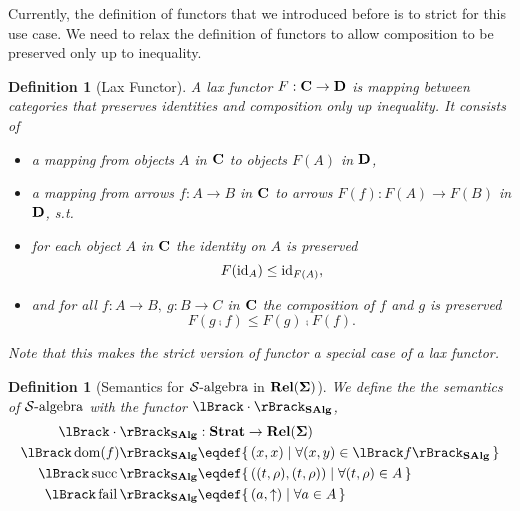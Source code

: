 \documentclass{article}
\newtheorem{definition}[theorem]{Definition}
\begin{document}
Currently, the definition of functors that we introduced before is to strict for this use case. We need to relax the definition of functors to allow composition to be preserved only up to inequality.

\begin{definition}[Lax Functor] \normalfont
  A \emph{lax} functor $F: \mathbf{C} \rightarrow \mathbf{D}$ is mapping between categories that preserves identities and composition only up inequality. It consists of
  \begin{itemize}
    \item a mapping from objects $A$ in $\mathbf{C}$ to objects $F(A)$ in $\mathbf{D}$,
    \item a mapping from arrows $f:A \rightarrow B$ in $\mathbf{C}$ to arrows $F(f):F(A) \rightarrow F(B)$ in $\mathbf{D}$, s.t.
    \item for each object $A$ in $\mathbf{C}$ the identity on $A$ is preserved \[ F(\operatorname{id}_A) \leq \operatorname{id}_{F(A)}, \]
    \item and for all $f:A \rightarrow B,\ g: B \rightarrow C$ in $\mathbf{C}$ the composition of $f$ and $g$ is preserved \[ F(g \comp f) \leq F(g) \comp F(f). \]
  \end{itemize}
  Note that this makes the strict version of functor a special case of a lax functor.
\end{definition}

\begin{definition}[Semantics for $\mathcal{S}\text{-algebra}$ in $\mathbf{Rel}(\mathbf{\Sigma})$] \normalfont
  We define the the semantics of $\mathcal{S}\text{-algebra}$ with the functor $\semsalg{\cdot}$,
  \begin{align*}
    \semsalg{\cdot} &: \Strat \rightarrow \Rel(\State) \\
    \semsalg{\dom(f)} &\eqdef \setbuild{(x,x)}{ \forall (x,y) \in \semsalg{f} } \\
    \semsalg{\lsucc} &\eqdef \setbuild{((t,\rho),(t,\rho))}{ \forall (t,\rho) \in A } \\
    \semsalg{\lfail} &\eqdef \setbuild{(a,\fail)}{\forall a \in A} \\
  \end{align*}
\end{definition}
\end{document}
